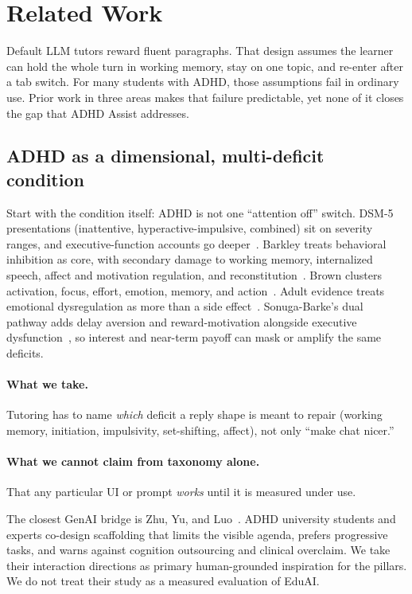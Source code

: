 \section{Related Work}
\label{sec:related}

Default LLM tutors reward fluent paragraphs. That design assumes the learner
can hold the whole turn in working memory, stay on one topic, and re-enter
after a tab switch. For many students with ADHD, those assumptions fail in
ordinary use. Prior work in three areas makes that failure predictable, yet
none of it closes the gap that ADHD Assist addresses.

\subsection{ADHD as a dimensional, multi-deficit condition}

Start with the condition itself: ADHD is not one ``attention off'' switch.
DSM-5 presentations (inattentive, hyperactive-impulsive, combined) sit on
severity ranges, and executive-function accounts go
deeper~\cite{apa2022dsm}. Barkley treats behavioral inhibition as core, with
secondary damage to working memory, internalized speech, affect and motivation
regulation, and reconstitution~\cite{barkley1997behavioral}. Brown clusters
activation, focus, effort, emotion, memory, and action~\cite{brown2013new}.
Adult evidence treats emotional dysregulation as more than a side
effect~\cite{beheshti2020emotion}. Sonuga-Barke's dual pathway adds delay
aversion and reward-motivation alongside executive
dysfunction~\cite{sonuga2003dual}, so interest and near-term payoff can mask
or amplify the same deficits.

\paragraph{What we take.}
Tutoring has to name \emph{which} deficit a reply shape is meant to repair
(working memory, initiation, impulsivity, set-shifting, affect), not only
``make chat nicer.''
\paragraph{What we cannot claim from taxonomy alone.}
That any particular UI or prompt \emph{works} until it is measured under use.

The closest GenAI bridge is Zhu, Yu, and Luo~\cite{zhu2026scaffolding}. ADHD
university students and experts co-design scaffolding that limits the visible
agenda, prefers progressive tasks, and warns against cognition outsourcing and
clinical overclaim. We take their interaction directions as primary
human-grounded inspiration for the pillars. We do not treat their study as a
measured evaluation of EduAI.

